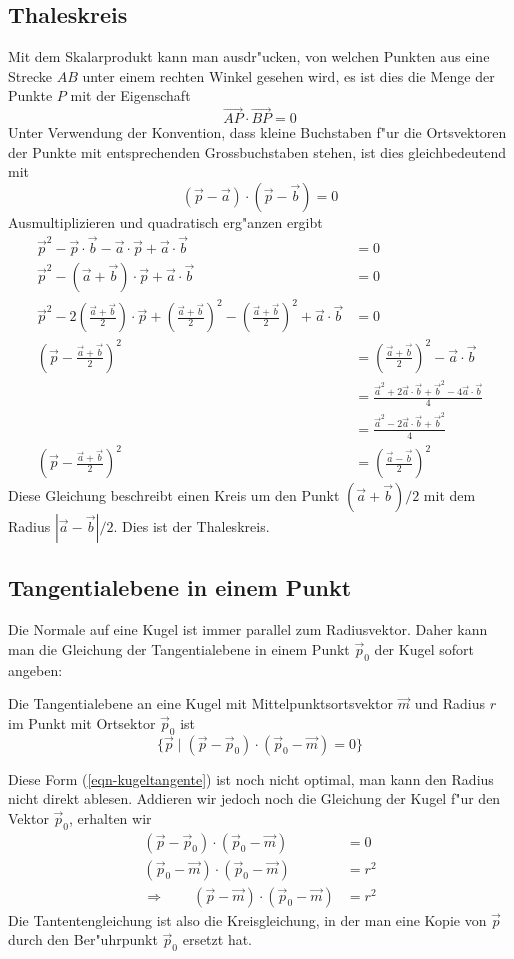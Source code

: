 \subsection{Thaleskreis}
Mit dem Skalarprodukt kann man ausdr"ucken, von welchen Punkten aus
eine Strecke $AB$ unter einem rechten Winkel gesehen wird, es ist
dies die Menge der Punkte $P$ mit der Eigenschaft
\[
\overrightarrow{AP}\cdot\overrightarrow{BP}=0
\]
Unter Verwendung der Konvention, dass kleine Buchstaben f"ur die
Ortsvektoren der Punkte mit entsprechenden Grossbuchstaben stehen, ist
dies gleichbedeutend mit
\[
(\vec p-\vec a)\cdot(\vec p-\vec b)=0
\]
Ausmultiplizieren und quadratisch erg"anzen ergibt
\begin{align*}
\vec p^2-\vec p\cdot\vec b-\vec a\cdot\vec p+\vec a\cdot\vec b&=0
\\
\vec p^2-(\vec a+\vec b)\cdot \vec p+\vec a\cdot\vec b&=0
\\
\vec p^2-2\left(\frac{\vec a+\vec b}{2}\right)\cdot \vec p
+\left(\frac{\vec a+\vec b}{2}\right)^2
-\left(\frac{\vec a+\vec b}{2}\right)^2
+\vec a\cdot\vec b&=0
\\
\left(\vec p
-\frac{\vec a+\vec b}{2}\right)^2&=
\left(\frac{\vec a+\vec b}{2}\right)^2-\vec a\cdot \vec b
\\
&=
\frac{\vec a^2+2\vec a\cdot\vec b+\vec b^2-4\vec a\cdot \vec b}{4}
\\
&=
\frac{\vec a^2-2\vec a\cdot\vec b+\vec b^2}{4}
\\
\left(\vec p
-\frac{\vec a+\vec b}{2}\right)^2&=
\left(\frac{\vec a-\vec b}{2}\right)^2
\end{align*}
Diese Gleichung beschreibt einen Kreis um den Punkt $(\vec a+\vec b)/2$
mit dem Radius $|\vec a-\vec b|/2$. Dies ist der Thaleskreis.

\subsection{Tangentialebene in einem Punkt}
Die Normale auf eine Kugel ist immer parallel zum Radiusvektor. Daher kann
man die Gleichung der Tangentialebene in einem Punkt $\vec p_0$ der Kugel
sofort angeben:
\begin{satz}\label{kugeltangentialebene}
Die Tangentialebene an eine Kugel mit Mittelpunktsortsvektor
$\vec m$ und Radius  $r$ im Punkt mit Ortsektor $\vec p_0$ ist
\begin{equation}
\{\vec p\;|\;
(\vec p-\vec p_0)\cdot(\vec p_0-\vec m)=0
\}
\label{eqn-kugeltangente}
\end{equation}
\end{satz}
Diese Form (\ref{eqn-kugeltangente}) ist noch nicht optimal, man kann den
Radius nicht direkt ablesen. Addieren wir jedoch noch die Gleichung
der Kugel f"ur den Vektor $\vec p_0$, erhalten wir
\begin{align*}
(\vec p-\vec p_0)\cdot(\vec p_0-\vec m)&=0\\
(\vec p_0-\vec m)\cdot(\vec p_0-\vec m)&=r^2\\
\Rightarrow\qquad
(\vec p-\vec m)\cdot(\vec p_0-\vec m)&=r^2
\end{align*}
Die Tantentengleichung ist also die Kreisgleichung, in der man
eine Kopie von $\vec p$ durch den Ber"uhrpunkt $\vec p_0$ ersetzt
hat.

